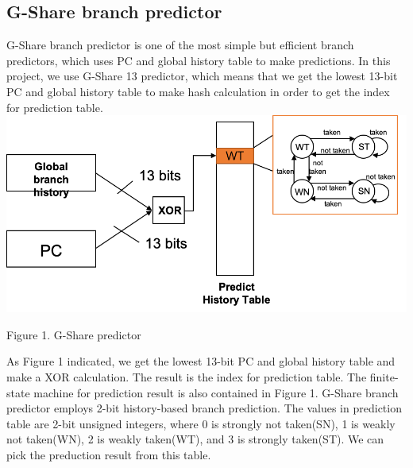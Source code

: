 \documentclass[conference]{IEEEtran}
\begin{document}
\subsection{G-Share branch predictor}
G-Share branch predictor is one of the most simple but efficient branch predictors, which uses PC and global history table to make predictions. In this project, we use G-Share 13 predictor, which means that 
we get the lowest 13-bit PC and global history table to make hash calculation in order to get the index for prediction table.
\includegraphics[width=\linewidth]{g-share.png}
\begin{center}
  {\small Figure 1. G-Share predictor}
\end{center}

As Figure 1 indicated, we get the lowest 13-bit PC and global history table and make a XOR calculation. The result is the index for prediction table.
The finite-state machine for prediction result is also contained in Figure 1. G-Share branch predictor employs 2-bit 
history-based branch prediction. The values in prediction table are 2-bit unsigned integers, 
where 0 is strongly not taken(SN), 1 is weakly not taken(WN), 2 is weakly taken(WT), and 3 is strongly taken(ST). We can pick the preduction result from this table.  
\end{document}
